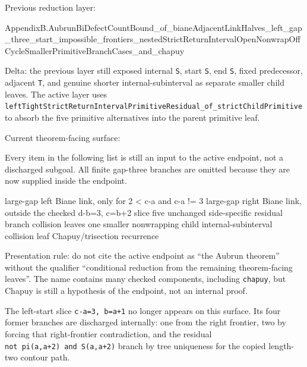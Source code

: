 \documentclass[
]{article}
\newenvironment{Shaded}{}{}
\newcommand{\NormalTok}[1]{#1}
\begin{document}
Previous reduction layer:

\begin{Shaded}
\begin{Highlighting}[]
\NormalTok{AppendixB.AubrunBiDefectCountBound\_of\_bianeAdjacentLinkHalves\_left\_gap\_three\_start\_impossible\_frontiers\_nestedStrictReturnIntervalOpenNonwrapOffCycleSmallerPrimitiveBranchCases\_and\_chapuy}
\end{Highlighting}
\end{Shaded}

Delta: the previous layer still exposed internal \texttt{S}, start
\texttt{S}, end \texttt{S}, fixed predecessor, adjacent \texttt{T}, and
genuine shorter internal-subinterval as separate smaller child leaves.
The active layer uses
\texttt{leftTightStrictReturnIntervalPrimitiveResidual\_of\_strictChildPrimitive}
to absorb the five primitive alternatives into the parent primitive
leaf.

Current theorem-facing surface:

Every item in the following list is still an input to the active
endpoint, not a discharged subgoal. All finite gap-three branches are
omitted because they are now supplied inside the endpoint.

\begin{Shaded}
\begin{Highlighting}[]
\NormalTok{large{-}gap left Biane link, only for 2 \textless{} c{-}a and c{-}a != 3}
\NormalTok{large{-}gap right Biane link, outside the checked d{-}b=3, c=b+2 slice}
\NormalTok{five unchanged side{-}specific residual branch collision leaves}
\NormalTok{one smaller nonwrapping child internal{-}subinterval collision leaf}
\NormalTok{Chapuy/trisection recurrence}
\end{Highlighting}
\end{Shaded}

Presentation rule: do not cite the active endpoint as ``the Aubrun
theorem'' without the qualifier ``conditional reduction from the
remaining theorem-facing leaves''. The name contains many checked
components, including \texttt{chapuy}, but Chapuy is still a hypothesis
of the endpoint, not an internal proof.

The left-start slice \texttt{c-a=3,\ b=a+1} no longer appears on this
surface. Its four former branches are discharged internally: one from
the right frontier, two by forcing that right-frontier contradiction,
and the residual \texttt{not\ pi(a,a+2)\ and\ S(a,a+2)} branch by tree
uniqueness for the copied length-two contour path.
\end{document}
